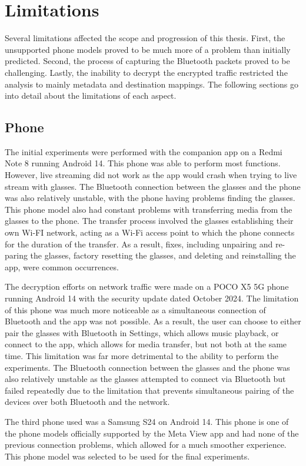 \section{Limitations}
Several limitations affected the scope and progression of this thesis. First, the unsupported phone models proved to be much more of a problem than initially predicted. Second, the process of capturing the Bluetooth packets proved to be challenging. Lastly, the inability to decrypt the encrypted traffic restricted the analysis to mainly metadata and destination mappings. The following sections go into detail about the limitations of each aspect.

\subsection*{Phone}
The initial experiments were performed with the companion app on a Redmi Note 8 running Android 14. This phone was able to perform most functions. However, live streaming did not work as the app would crash when trying to live stream with glasses. The Bluetooth connection between the glasses and the phone was also relatively unstable, with the phone having problems finding the glasses. This phone model also had constant problems with transferring media from the glasses to the phone. The transfer process involved the glasses establishing their own Wi-FI network, acting as a Wi-Fi access point to which the phone connects for the duration of the transfer. As a result, fixes, including unpairing and re-paring the glasses, factory resetting the glasses, and deleting and reinstalling the app, were common occurrences.

The decryption efforts on network traffic were made on a POCO X5 5G phone running Android 14 with the security update dated October 2024. The limitation of this phone was much more noticeable as a simultaneous connection of Bluetooth and the app was not possible. As a result, the user can choose to either pair the glasses with Bluetooth in Settings, which allows music playback, or connect to the app, which allows for media transfer, but not both at the same time. This limitation was far more detrimental to the ability to perform the experiments. The Bluetooth connection between the glasses and the phone was also relatively unstable as the glasses attempted to connect via Bluetooth but failed repeatedly due to the limitation that prevents simultaneous pairing of the devices over both Bluetooth and the network.

The third phone used was a Samsung S24 on Android 14. This phone is one of the phone models officially supported by the Meta View app and had none of the previous connection problems, which allowed for a much smoother experience. This phone model was selected to be used for the final experiments.

